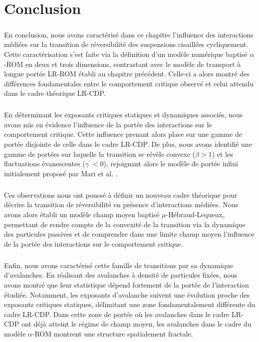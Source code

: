 \section{Conclusion}

\subparagraph{}En conclusion, nous avons caractérisé dans ce chapitre l'influence des interactions médiées sur la transition de réversibilité des suspensions cisaillées cycliquement. Cette caractérisation s'est faite via la définition d'un modèle numérique baptisé $\alpha$-ROM en deux et trois dimensions, contrastant avec le modèle de transport à longue portée LR-ROM établi au chapitre précédent. Celle-ci a alors montré des différences fondamentales entre le comportement critique observé et celui attendu dans le cadre théorique LR-CDP.

\subparagraph{}En déterminant les exposants critiques statiques et dynamiques associés, nous avons mis en évidence l'influence de la portée des interactions sur le comportement critique. Cette influence prenant alors place sur une gamme de portée disjointe de celle dans le cadre LR-CDP. De plus, nous avons identifié une gamme de portées sur laquelle la transition se révèle convexe ($\beta >1$) et les fluctuations évanescentes ($\gamma^\prime < 0$), rejoignant alors le modèle de portée infini initialement proposé par Mari et al. \cite{mari_absorbing_2022}.

\subparagraph{}Ces observations nous ont poussé à définir un nouveau cadre théorique pour décrire la transition de réversibilité en présence d'interactions médiées. Nous avons alors établi un modèle champ moyen baptisé $\mu$-Hébraud-Lequeux, permettant de rendre compte de la convexité de la transition via la dynamique des particules passives et de comprendre dans une limite champ moyen l'influence de la portée des interactions sur le comportement critique.

\subparagraph{}Enfin, nous avons caractérisé cette famille de transitions par sa dynamique d'avalanches. En réalisant des avalanches à densité de particules fixées, nous avons montré que leur statistique dépend fortement de la portée de l'interaction étudiée. Notamment, les exposants d'avalanche suivent une évolution proche des exposants critiques statiques, délimitant une zone fondamentalement différente du cadre LR-CDP. Dans cette zone de portée où les avalanches dans le cadre LR-CDP ont déjà atteint le régime de champ moyen, les avalanches dans le cadre du modèle $\alpha$-ROM montrent une structure spatialement fractale.